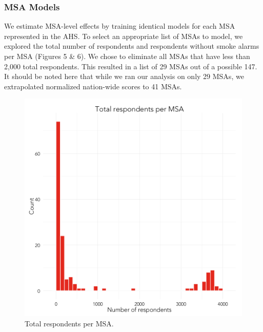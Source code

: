 \documentclass{sig-alternate}
\begin{document}
\subsubsection{MSA Models}
We estimate MSA-level effects by training identical models for each MSA represented in the AHS. To select an appropriate list of MSAs to model, we explored the total number of respondents and respondents without smoke alarms per MSA (Figures 5 \& 6). We chose to eliminate all MSAs that have less than 2,000 total respondents.  This resulted in a list of 29 MSAs out of a possible 147. It should be noted here that while we ran our analysis on only 29 MSAs, we extrapolated normalized nation-wide scores to 41 MSAs.

\begin{figure}
\centering 
\includegraphics[scale=0.42]{compute-msa-stats-histogram-1.png}
\caption{Total respondents per MSA.}
\end{figure}
\end{document}
